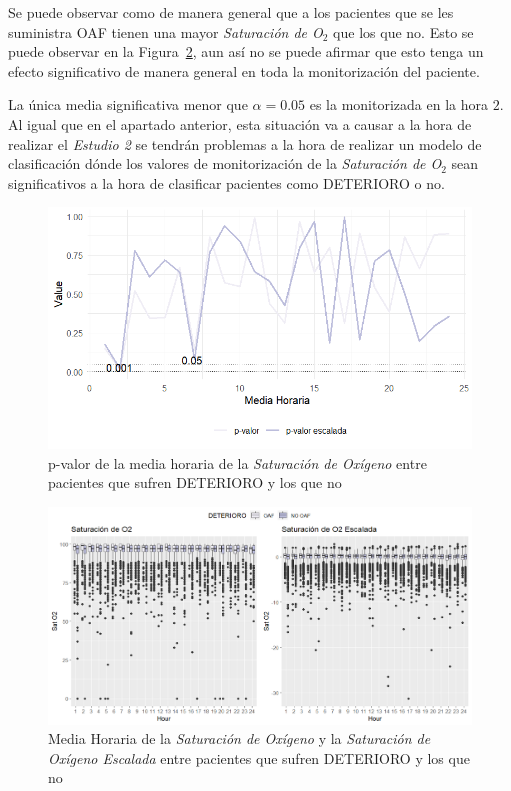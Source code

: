 Se puede observar como de manera general que a los pacientes que se les suministra OAF tienen una mayor \textit{Saturación de O$_2$} que los que no. Esto se puede observar en la Figura~\ref{fig:satO2-boxplot-mean}, aun así no se puede afirmar que esto tenga un efecto significativo de manera general en toda la monitorización del paciente.

La única media significativa menor que $\alpha = 0.05$ es la monitorizada en la hora $2$. Al igual que en el apartado anterior, esta situación va a causar a la hora de realizar el \textit{Estudio 2} se tendrán problemas a la hora de realizar un modelo de clasificación dónde los valores de monitorización de la \textit{Saturación de O$_2$} sean significativos a la hora de clasificar pacientes como DETERIORO o no.

\begin{figure}[H]
    \centering
    \includegraphics[scale = 1]{./img/mean-SatO2.png}
    \caption{p-valor de la media horaria de la \textit{Saturación de Oxígeno} entre pacientes que sufren DETERIORO y los que no}
    \label{fig:mean-SatO2}
\end{figure}

\newpage
\thispagestyle{empty}
\begin{landscape}
\begin{figure}[H]
    \centering
    \includegraphics[scale = 0.68]{./img/satO2-boxplot-mean.png}
    \caption{Media Horaria de la \textit{Saturación de Oxígeno} y la \textit{Saturación de Oxígeno Escalada} entre pacientes que sufren DETERIORO y los que no}
    \label{fig:satO2-boxplot-mean}
\end{figure}
\end{landscape}
\restoregeometry


